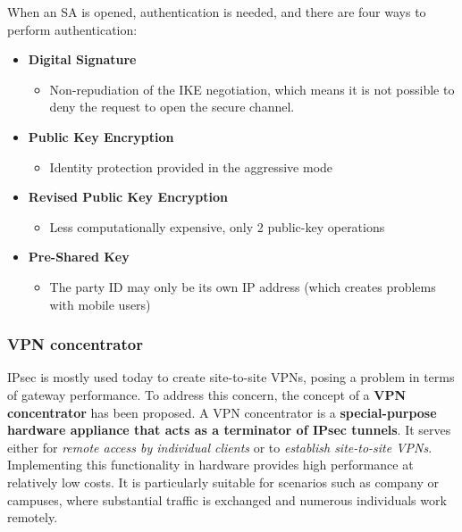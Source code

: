 When an SA is opened, authentication is needed, and there are four ways to perform authentication:

\begin{itemize}
    \item \textbf{Digital Signature}
          \begin{itemize}
              \item Non-repudiation of the IKE negotiation, which means it is not possible to deny the request to open the secure channel.
          \end{itemize}

    \item \textbf{Public Key Encryption}
          \begin{itemize}
              \item Identity protection provided in the aggressive mode
          \end{itemize}

    \item \textbf{Revised Public Key Encryption}
          \begin{itemize}
              \item Less computationally expensive, only 2 public-key operations
          \end{itemize}

    \item \textbf{Pre-Shared Key}
          \begin{itemize}
              \item The party ID may only be its own IP address (which creates problems with mobile users)
          \end{itemize}
\end{itemize}



\subsubsection{VPN concentrator}
IPsec is mostly used today to create site-to-site VPNs, posing a problem in terms of gateway performance. To address this concern, the concept of a \textbf{VPN concentrator} has been proposed. A VPN concentrator is a \textbf{special-purpose hardware appliance that acts as a terminator of IPsec tunnels}. It serves either for \textit{remote access by individual clients} or to \textit{establish site-to-site VPNs}. Implementing this functionality in hardware provides high performance at relatively low costs. It is particularly suitable for scenarios such as company or campuses, where substantial traffic is exchanged and numerous individuals work remotely.

